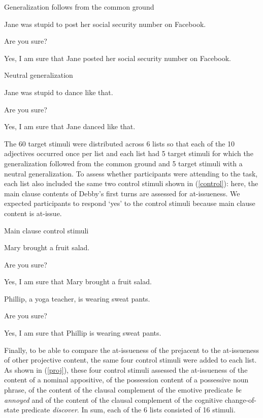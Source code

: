 \documentclass[11pt,fleqn]{article}
\newcommand{\6}{\mbox{$[\hspace*{-.6mm}[$}}
\newcommand{\9}{\mbox{$]\hspace*{-.6mm}]$}}
\begin{document}
\begin{exe}
\ex\label{sure2} Generalization follows from the common ground
\begin{xlist}
 Jane was stupid to post her social security number on Facebook. 

 Are you sure?

 Yes, I am sure that Jane posted her social security number on Facebook.
\end{xlist}

\ex\label{sure22} Neutral generalization
\begin{xlist}
 Jane was stupid to dance like that. 

 Are you sure?

 Yes, I am sure that Jane danced like that.
\end{xlist}
\end{exe}

The 60 target stimuli were distributed across 6 lists so that each of the 10 adjectives occurred once per list and each list had 5 target stimuli for which the generalization followed from the common ground and 5 target stimuli with a neutral generalization. To assess whether participants were attending to the task, each list also included the same two control stimuli shown in (\ref{control}): here, the main clause contents of Debby's first turns are assessed for at-issueness. We expected participants to respond `yes' to the control stimuli because main clause content is at-issue.

\begin{exe}
\ex\label{control} Main clause control stimuli
\begin{xlist}
\ex
\begin{xlist}
 Mary brought a fruit salad.

 Are you sure?

 Yes, I am sure that Mary brought a fruit salad.
\end{xlist}
\ex 
\begin{xlist}
 Phillip, a yoga teacher, is wearing sweat pants.

 Are you sure?

 Yes, I am sure that Phillip is wearing sweat pants.
\end{xlist}
\end{xlist}
\end{exe}

Finally, to be able to compare the at-issueness of the prejacent to the at-issueness of other projective content, the same four control stimuli were added to each list. As shown in (\ref{proj}), these four control stimuli assessed the at-issueness of the content of a nominal appositive, of the possession content of a possessive noun phrase, of the content of the clausal complement of the emotive predicate {\em be annoyed} and of the content of the clausal complement of the cognitive change-of-state predicate {\em discover}. In sum, each of the 6 lists consisted of 16 stimuli.
\end{document}

